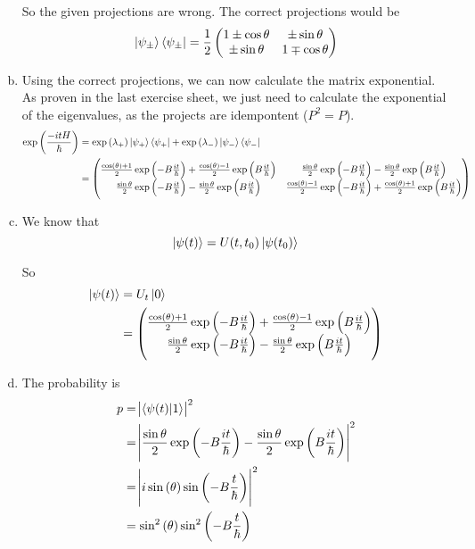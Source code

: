\documentclass[a4paper,german,12pt,smallheadings]{scrartcl}
\begin{document}
\begin{enumerate}[a)]
    So the given projections are wrong. The correct projections would be
    \begin{equation*}
      \ket{\psi_\pm} \bra{\psi_\pm} = \frac{1}{2} \begin{pmatrix}
        1 \pm \cos \theta & \pm \sin \theta \\
        \pm \sin \theta & 1 \mp \cos \theta
      \end{pmatrix}
    \end{equation*}
  \item
    Using the correct projections, we can now calculate the matrix exponential.
    As proven in the last exercise sheet, we just need to calculate the
    exponential of the eigenvalues, as the projects are idempontent ($P^2 =
    P$).
    \begin{align*}
      \exp\del{\frac{-itH}{\hbar}} &= \exp\del{\lambda_+} \ket{\psi_+}\bra{\psi_+} + \exp\del{\lambda_-} \ket{\psi_-}\bra{\psi_-} \\
                                   &= 
      \begin{pmatrix}
        \frac{\cos(\theta) + 1}{2} \exp\del{-B\frac{it}{\hbar}} + \frac{\cos(\theta) - 1}{2} \exp\del{B\frac{it}{\hbar}} &
        \frac{\sin\theta}{2} \exp\del{-B\frac{it}{\hbar}} - \frac{\sin\theta}{2} \exp\del{B\frac{it}{\hbar}} \\
        \frac{\sin\theta}{2} \exp\del{-B\frac{it}{\hbar}} - \frac{\sin\theta}{2} \exp\del{B\frac{it}{\hbar}} &
        \frac{\cos(\theta) - 1}{2} \exp\del{-B\frac{it}{\hbar}} + \frac{\cos(\theta) + 1}{2} \exp\del{B\frac{it}{\hbar}}
      \end{pmatrix}
    \end{align*}
  \item
    We know that
    \begin{equation*}
      \ket{\psi(t)} = U(t,t_0) \ket{\psi(t_0)}
    \end{equation*}

    So
    \begin{align*}
      \ket{\psi(t)} &= U_t \ket{0} \\
                    &= 
      \begin{pmatrix}
        \frac{\cos(\theta) + 1}{2} \exp\del{-B\frac{it}{\hbar}} + \frac{\cos(\theta) - 1}{2} \exp\del{B\frac{it}{\hbar}} \\
        \frac{\sin\theta}{2} \exp\del{-B\frac{it}{\hbar}} - \frac{\sin\theta}{2} \exp\del{B\frac{it}{\hbar}}
      \end{pmatrix}
    \end{align*}
  \item
    The probability is
    \begin{align*}
      p &= \envert{\braket{\psi(t)|1}}^2 \\
        &=  \envert{\frac{\sin\theta}{2} \exp\del{-B\frac{it}{\hbar}} - \frac{\sin\theta}{2} \exp\del{B\frac{it}{\hbar}}}^2 \\
        &=  \envert{i\sin\del\theta\sin\del{-B\frac{t}{\hbar}}}^2 \\
        &=  \sin^2\del\theta\sin^2\del{-B\frac{t}{\hbar}}
    \end{align*}


\end{enumerate}
\end{document}
